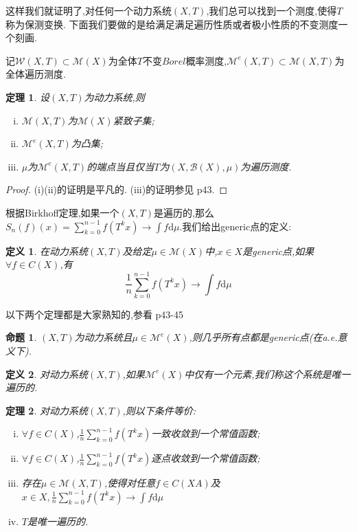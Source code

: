 \documentclass[a4paper,11pt,oneside]{book}
\newtheorem{theorem}{\textbf{\hspace{0.7cm}定理}}[section]
\newtheorem{definition}{\textbf{\hspace{0.7cm}定义}}[section]
\newtheorem{proposition}{\textbf{\hspace{0.7cm}命题}}[section]
\newcommand{\ms}[1]{\mathscr{#1}}
\begin{document}
这样我们就证明了,对任何一个动力系统$(X,T)$,我们总可以找到一个测度,使得$T$称为保测变换.
下面我们要做的是给满足满足遍历性质或者极小性质的不变测度一个刻画.

记$\mathcal{W}(X,T)\subset\mathcal{M}(X)$为全体$T$不变$Borel$概率测度,$\mathcal{M}^e(X,T)\subset\mathcal{M}(X,T)$为全体遍历测度.

\begin{theorem}
设$(X,T)$为动力系统,则
\begin{enumerate}[(i)]
\item $\mathcal{M}(X,T)$为$\mathcal{M}(X)$紧致子集;
\item $\mathcal{M}^e(X,T)$为凸集;
\item $\mu$为$\mathcal{M}^e(X,T)$的端点当且仅当$T$为$(X,\ms B(X),\mu)$为遍历测度.
\end{enumerate}
\end{theorem}
\begin{proof}
(i)(ii)的证明是平凡的.
(iii)的证明参见\cite{hy} p43.
\end{proof}

根据Birkhoff定理,如果一个$(X,T)$是遍历的,那么$S_n(f)(x)=\sum_{k=0}^{n-1}f(T^kx)\rightarrow \int f \mathrm d \mu$.我们给出generic点的定义:

\begin{definition}
在动力系统$(X,T)$及给定$\mu\in\mathcal{M}(X)$中,$x\in X$是generic点,如果$\forall f\in C(X)$,有
$$\frac{1}{n}\sum_{k=0}^{n-1}f(T^kx)\rightarrow \int f\mathrm d \mu$$
\end{definition}

以下两个定理都是大家熟知的,参看\cite{hy} p43-45


\begin{proposition}
$(X,T)$为动力系统且$\mu\in\mathcal{M}^e(X)$,则几乎所有点都是generic点(在a.e.意义下).
\end{proposition}


\begin{definition}
对动力系统$(X,T)$,如果$\mathcal{M}^e(X)$中仅有一个元素,我们称这个系统是唯一遍历的.
\end{definition}

\begin{theorem}
对动力系统$(X,T)$,则以下条件等价:
\begin{enumerate}[(i)]
\item $\forall f\in C(X)$,$\frac{1}{n}\sum_{k=0}^{n-1}f(T^kx)$一致收敛到一个常值函数;
\item $\forall f\in C(X)$,$\frac{1}{n}\sum_{k=0}^{n-1}f(T^kx)$逐点收敛到一个常值函数;
\item 存在$\mu\in\mathcal{M}(X,T)$,使得对任意$f\in C(XA)$及$x\in X,\frac{1}{n}\sum_{k=0}^{n-1}f(T^kx)\rightarrow \int f \mathrm d \mu$
\item $T$是唯一遍历的.
\end{enumerate}
\end{theorem}
\end{document}

